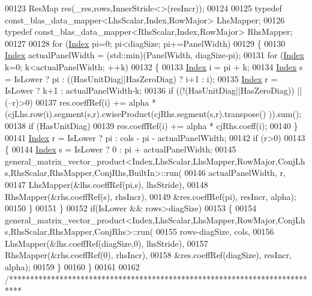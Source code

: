 \begin{DoxyCode}
00123     ResMap res(\_res,rows,InnerStride<>(resIncr));
00124 
00125     \textcolor{keyword}{typedef} const\_blas\_data\_mapper<LhsScalar,Index,RowMajor> LhsMapper;
00126     \textcolor{keyword}{typedef} const\_blas\_data\_mapper<RhsScalar,Index,RowMajor> RhsMapper;
00127 
00128     \textcolor{keywordflow}{for} (\hyperlink{namespace_eigen_a62e77e0933482dafde8fe197d9a2cfde}{Index} pi=0; pi<diagSize; pi+=PanelWidth)
00129     \{
00130       \hyperlink{namespace_eigen_a62e77e0933482dafde8fe197d9a2cfde}{Index} actualPanelWidth = (std::min)(PanelWidth, diagSize-pi);
00131       \textcolor{keywordflow}{for} (\hyperlink{namespace_eigen_a62e77e0933482dafde8fe197d9a2cfde}{Index} k=0; k<actualPanelWidth; ++k)
00132       \{
00133         \hyperlink{namespace_eigen_a62e77e0933482dafde8fe197d9a2cfde}{Index} i = pi + k;
00134         \hyperlink{namespace_eigen_a62e77e0933482dafde8fe197d9a2cfde}{Index} s = IsLower ? pi  : ((HasUnitDiag||HasZeroDiag) ? i+1 : i);
00135         \hyperlink{namespace_eigen_a62e77e0933482dafde8fe197d9a2cfde}{Index} r = IsLower ? k+1 : actualPanelWidth-k;
00136         \textcolor{keywordflow}{if} ((!(HasUnitDiag||HasZeroDiag)) || (--r)>0)
00137           res.coeffRef(i) += alpha * (cjLhs.row(i).segment(s,r).cwiseProduct(cjRhs.segment(s,r).transpose()
      )).sum();
00138         \textcolor{keywordflow}{if} (HasUnitDiag)
00139           res.coeffRef(i) += alpha * cjRhs.coeff(i);
00140       \}
00141       \hyperlink{namespace_eigen_a62e77e0933482dafde8fe197d9a2cfde}{Index} r = IsLower ? pi : cols - pi - actualPanelWidth;
00142       \textcolor{keywordflow}{if} (r>0)
00143       \{
00144         \hyperlink{namespace_eigen_a62e77e0933482dafde8fe197d9a2cfde}{Index} s = IsLower ? 0 : pi + actualPanelWidth;
00145         
      general\_matrix\_vector\_product<Index,LhsScalar,LhsMapper,RowMajor,ConjLhs,RhsScalar,RhsMapper,ConjRhs,BuiltIn>::run(
00146             actualPanelWidth, r,
00147             LhsMapper(&lhs.coeffRef(pi,s), lhsStride),
00148             RhsMapper(&rhs.coeffRef(s), rhsIncr),
00149             &res.coeffRef(pi), resIncr, alpha);
00150       \}
00151     \}
00152     \textcolor{keywordflow}{if}(IsLower && rows>diagSize)
00153     \{
00154       
      general\_matrix\_vector\_product<Index,LhsScalar,LhsMapper,RowMajor,ConjLhs,RhsScalar,RhsMapper,ConjRhs>::run(
00155             rows-diagSize, cols,
00156             LhsMapper(&lhs.coeffRef(diagSize,0), lhsStride),
00157             RhsMapper(&rhs.coeffRef(0), rhsIncr),
00158             &res.coeffRef(diagSize), resIncr, alpha);
00159     \}
00160   \}
00161 
00162 \textcolor{comment}{/***************************************************************************}

\end{DoxyCode}
